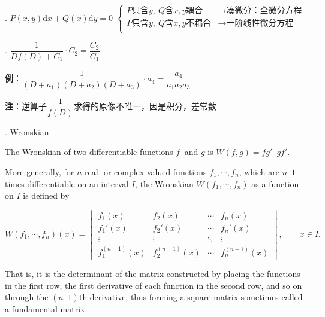 \documentclass[UTF8]{ctexart}
\numberwithin{equation}{section}
\numberwithin{figure}{section}
\numberwithin{table}{section}
\newcommand\dif{\mathrm{d}}
\newcommand\no{\noindent}
\begin{document}
\begin{spacing}{2}
\vspace{0.3cm}

\no7. $P(x,y)\dif x+Q(x)\dif y=0$
$\left\{\begin{array}{ll}
P\text{只含}y,\ Q\text{含}x,y\text{耦合}&\longrightarrow\text{凑微分：全微分方程}\\
P\text{只含}y,\ Q\text{含}x,y\text{不耦合}&\longrightarrow\text{一阶线性微分方程}\\
\end{array}\right.$

\vspace{0.3cm}

\no8. $\dfrac{1}{Df(D)+C_1}\cdot C_2=\dfrac{C_2}{C_1}$

\vspace{0.3cm}

\textbf{例}：$\dfrac{1}{(D+a_1)(D+a_2)(D+a_3)}\cdot a_4=\dfrac{a_4}{a_1a_2a_3}$

\vspace{0.3cm}

\textbf{注}：逆算子$\dfrac{1}{f(D)}$求得的原像不唯一，因是积分，差常数

\no9. \textcolor[rgb]{1,0,0}{Wronskian}

The Wronskian of two differentiable functions $f$  and $g$ is $W(f,g) = fg' – gf'$.

More generally, for $n$ real- or complex-valued functions $f_1,\cdots, f_n$, which are $n – 1$ times differentiable on an interval $I$, the Wronskian $W(f_1,\cdots, f_n)$ as a function on $I$ is defined by

\vspace{0.3cm}

\centerline{\textcolor[rgb]{0,0,1}{${\displaystyle W(f_{1},\cdots ,f_{n})(x)={\begin{vmatrix}f_{1}(x)&f_{2}(x)&\cdots &f_{n}(x)\\f_{1}'(x)&f_{2}'(x)&\cdots &f_{n}'(x)\\\vdots &\vdots &\ddots &\vdots \\f_{1}^{(n-1)}(x)&f_{2}^{(n-1)}(x)&\cdots &f_{n}^{(n-1)}(x)\end{vmatrix}},\qquad x\in I.}$}}

\vspace{0.3cm}

That is, it is the determinant of the matrix constructed by placing the functions in the first row, the first derivative of each function in the second row, and so on through the $(n – 1)$th derivative, thus forming a square matrix sometimes called a fundamental matrix.


\end{spacing}
\end{document}
